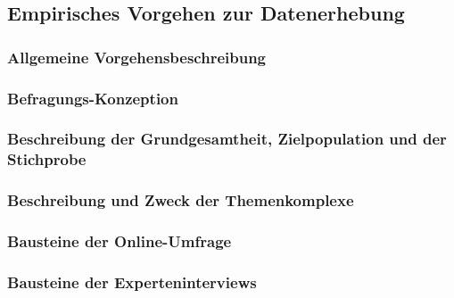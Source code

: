 \documentclass[../../main.tex]{subfiles}
\begin{document}
\subsection{Empirisches Vorgehen zur Datenerhebung}

\subsubsection{Allgemeine Vorgehensbeschreibung}
\label{allgemeine_vorgehensbeschreibung_empirik}


\subsubsection{Befragungs-Konzeption}
\label{befragungs_konzeption}


\subsubsection{Beschreibung der Grundgesamtheit, Zielpopulation und der Stichprobe}
\label{beschreibung_zielpopulation}


\subsubsection{Beschreibung und Zweck der Themenkomplexe}
\label{beschreibung_themenbereiche}


\subsubsection{Bausteine der Online-Umfrage}
\label{bausteine_onlineumfrage}


\subsubsection{Bausteine der Experteninterviews}
\label{bausteine_interviews}

\end{document}

